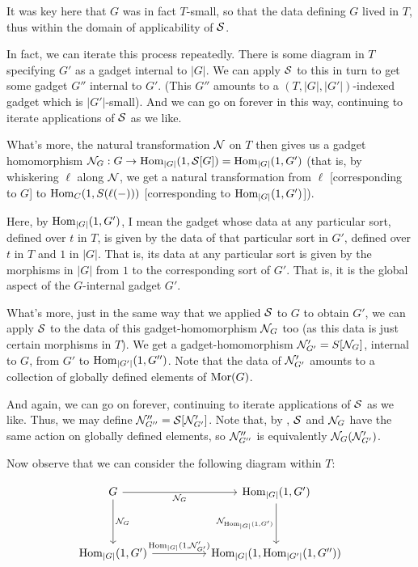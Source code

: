 \documentclass[./main.tex]{subfiles}
\begin{document}
\begin{observation}
It was key here that $G$ was in fact $T$-small, so that the data defining $G$ lived in $T$, thus within the domain of applicability of $\mathcal{S}$.

In fact, we can iterate this process repeatedly. There is some diagram in $T$ specifying $G'$ as a gadget internal to $|G|$. We can apply $\mathcal{S}$ to this in turn to get some gadget $G''$ internal to $G'$. (This $G''$ amounts to a $(T, |G|, |G'|)$-indexed gadget which is $|G'|$-small). And we can go on forever in this way, continuing to iterate applications of $\mathcal{S}$ as we like.

What's more, the natural transformation $\mathcal{N}$ on $T$ then gives us a gadget homomorphism $\mathcal{N}_G : G \to \operatorname{Hom}_{|G|}(1, \mathcal{S}[G]) = \operatorname{Hom}_{|G|}(1, G')$ (that is, by whiskering $\ell$ along $\mathcal{N}$, we get a natural transformation from $\ell$ [corresponding to $G$] to $\operatorname{Hom}_C(1, S(\ell(-)))$ [corresponding to $\operatorname{Hom}_{|G|}(1, G')$]).

Here, by $\operatorname{Hom}_{|G|}(1, G')$, I mean the gadget whose data at any particular sort, defined over $t$ in $T$, is given by the data of that particular sort in $G'$, defined over $t$ in $T$ and $1$ in $|G|$. That is, its data at any particular sort is given by the morphisms in $|G|$ from $1$ to the corresponding sort of $G'$. That is, it is the global aspect of the $G$-internal gadget $G'$.

What's more, just in the same way that we applied $\mathcal{S}$ to $G$ to obtain $G'$, we can apply $\mathcal{S}$ to the data of this gadget-homomorphism $\mathcal{N}_G$ too (as this data is just certain morphisms in $T$). We get a gadget-homomorphism $\mathcal{N}'_{G'} = S[\mathcal{N}_G]$, internal to $G$, from $G'$ to $\operatorname{Hom}_{|G'|}(1, G'')$. Note that the data of $\mathcal{N}'_{G'}$ amounts to a collection of globally defined elements of $\operatorname{Mor}(G)$.

And again, we can go on forever, continuing to iterate applications of $\mathcal{S}$ as we like. Thus, we may define $\mathcal{N}''_{G''} = \mathcal{S}[\mathcal{N}'_{G'}]$. Note that, by , $\mathcal{S}$ and $\mathcal{N}_G$ have the same action on globally defined elements, so $\mathcal{N}''_{G''}$ is equivalently $\mathcal{N}_G(\mathcal{N}'_{G'})$.

Now observe that we can consider the following diagram within $T$:

\[\begin{tikzcd}
	G && {\Hom_{|G|}(1, G')} \\
	\\
	{\Hom_{|G|}(1, G')} && {\Hom_{|G|}(1, \Hom_{|G'|}(1, G''))}
	\arrow["\introN_G", from=1-1, to=3-1]
	\arrow["\introN_G"', from=1-1, to=1-3]
	\arrow["\introN_{\Hom_{|G|}(1, G')}"', from=1-3, to=3-3]
	\arrow["{\Hom_{|G|}(1, \introN'_{G'})}", from=3-1, to=3-3]
\end{tikzcd}\]


\end{observation}
\end{document}
